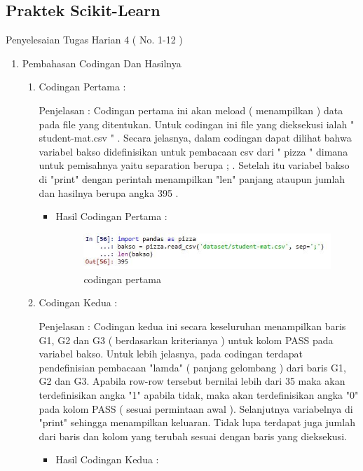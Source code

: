 \begin{enumerate}
\subsection{Praktek Scikit-Learn}
Penyelesaian Tugas Harian 4 ( No. 1-12 )
\begin{enumerate}
\item Pembahasan Codingan Dan Hasilnya
\begin{enumerate}
\item Codingan Pertama :
\par Penjelasan : Codingan pertama ini akan meload ( menampilkan ) data pada file yang ditentukan. Untuk codingan ini file yang dieksekusi ialah " student-mat.csv " . Secara jelasnya, dalam codingan dapat dilihat bahwa variabel bakso didefinisikan untuk pembacaan csv dari " pizza " dimana untuk pemisahnya yaitu separation berupa ; . Setelah itu variabel bakso di "print" dengan perintah menampilkan "len" panjang ataupun jumlah dan hasilnya berupa angka 395 . 
\par
\begin{itemize}
\par
\item Hasil Codingan Pertama :
\par

\begin{figure}[ht]
\centering
\includegraphics[scale=0.7]{figures/hasil1.jpg}
\caption{codingan pertama}
\label{contoh}
\end{figure}

\par
\end{itemize}
\item Codingan Kedua :
\par Penjelasan : Codingan kedua ini secara keseluruhan menampilkan  baris  G1, G2 dan G3 ( berdasarkan kriterianya ) untuk kolom PASS pada variabel bakso. Untuk lebih jelasnya, pada codingan terdapat pendefinisian pembacaan "lamda" ( panjang gelombang ) dari baris G1, G2 dan G3. Apabila row-row tersebut bernilai lebih dari 35 maka akan terdefinisikan angka "1" apabila tidak, maka akan terdefinisikan angka "0" pada kolom PASS ( sesuai permintaan awal ). Selanjutnya variabelnya di "print" sehingga menampilkan keluaran. Tidak lupa terdapat juga jumlah dari baris dan kolom yang terubah sesuai dengan baris yang dieksekusi.
\par 
\begin{itemize}
\par
\item Hasil Codingan Kedua :


\end{itemize}
\end{enumerate}
\end{enumerate}
\end{enumerate}
